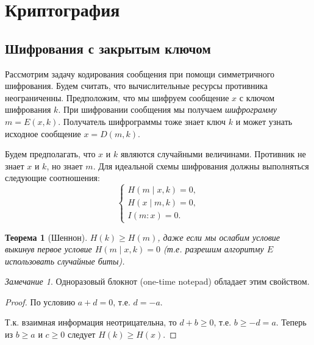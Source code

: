 \documentclass[12pt]{article}
\theoremstyle{definition}
\theoremstyle{plain}
\newtheorem{theorem}{Теорема}[section]
\theoremstyle{remark}
\newtheorem{remark}{Замечание}[section]
\begin{document}
\section{Криптография}
\subsection{Шифрования с закрытым ключом}

Рассмотрим задачу кодирования сообщения при помощи симметричного шифрования.
Будем считать, что вычислительные ресурсы противника неограниченны. 
Предположим, что мы шифруем сообщение $x$ с ключом шифрования $k$. При
шифровании сообщения мы получаем \emph{шифрограмму} $m = E(x, k)$.
Получатель шифрограммы тоже знает ключ $k$ и может узнать исходное
сообщение $x= D(m,k).$

Будем предполагать, что $x$ и $k$ являются случайными 
величинами. Противник не знает $x$ и $k$, но знает $m$. Для идеальной
схемы шифрования должны выполняться следующие соотношения:
\[
\begin{cases}
    H(m\mid x,k) = 0,\\
    H(x\mid m,k) = 0,\\
    I(m : x) = 0.
\end{cases}
\]

\begin{theorem}[Шеннон]
    $H(k)\ge H(m)$, даже если мы ослабим условие выкинув первое условие
    $H(m\mid x,k) = 0$ (т.е. разрешим алгоритму $E$ использовать случайные
    биты).
\end{theorem}     
\begin{remark}
    Одноразовый блокнот (one-time notepad) обладает этим свойством.
\end{remark}
\begin{proof}
    По условию $a + d = 0$, т.е. $d = -a$. 

    \begin{center}
    \end{center}
    Т.к. взаимная информация неотрицательна, то $d + b\ge 0$, т.е. 
    $b \ge -d = a$. Теперь из $b \ge a$ и $c\ge 0$ следует $H(k)\ge H(x)$.                                  
\end{proof}
\end{document}
